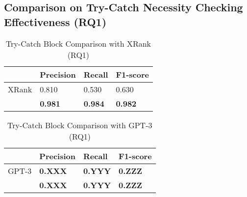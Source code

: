 \subsection{Comparison on Try-Catch Necessity Checking Effectiveness (RQ1)}

\begin{table}[t]%
  \caption{Try-Catch Block Comparison with XRank (RQ1)}
  \vspace{-12pt}
  \small
	\begin{center}
		\renewcommand{\arraystretch}{1}
		\begin{tabular}{| p{3.05cm}<{\centering} | p{1.2cm}<{\centering} | p{1.2cm}<{\centering}| p{1.2cm}<{\centering}|}
		  \hline
			  & Precision  &  Recall & F1-score \\
			\hline
			\hline
			XRank & 0.810 & 0.530 & 0.630\\
			\hline
			\tool   &  \textbf{0.981} &  {\bf 0.984} & \textbf{0.982}\\
			\hline
		\end{tabular}
		\label{tab:xblock-1}
	\end{center}
\end{table}

\begin{table}[t]%
  \caption{Try-Catch Block Comparison with GPT-3 (RQ1)}
  \vspace{-12pt}
  \small
	\begin{center}
		\renewcommand{\arraystretch}{1}
		\begin{tabular}{| p{3.05cm}<{\centering} | p{1.2cm}<{\centering} | p{1.2cm}<{\centering}| p{1.2cm}<{\centering}|}
		  \hline
			  & Precision  &  Recall & F1-score \\
			\hline
			GPT-3 & {\bf 0.XXX}  & \textbf{0.YYY}   & {\bf 0.ZZZ}\\
			\hline
			\tool   &  \textbf{0.XXX} &  {\bf 0.YYY} & \textbf{0.ZZZ}\\
			\hline
		\end{tabular}
		\label{tab:xblock-2}
	\end{center}
\end{table}



